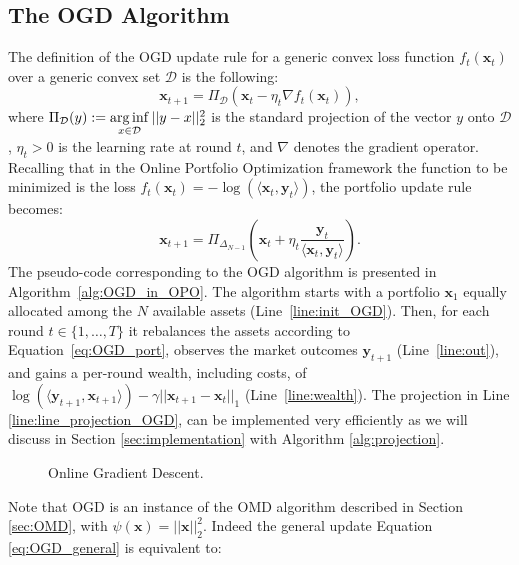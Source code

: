 \subsection{The OGD Algorithm}
\label{sec:OGD}
The definition of the OGD update rule for a generic convex loss function $f_t(\mathbf{x}_t)$ over a generic convex set $\mathcal D$ is the following:
\begin{equation}\label{eq:OGD_general}
  \mathbf{x}_{t+1} = \Pi_{\mathcal D} \left( \mathbf{x}_t - \eta_t \nabla f_t(\mathbf{x}_t) \right),
\end{equation}
where $\Pi_{\mathcal D} (y) := \operatorname*{arg\,inf}\limits_{x \in \mathcal D } || y - x ||_2^2$ is the standard projection of the vector $y$ onto $\mathcal D$, $\eta_t > 0$ is the learning rate at round $t$, and $\nabla$ denotes the gradient operator.
Recalling that in the Online Portfolio Optimization framework the function to be minimized is the loss $f_t(\mathbf{x}_t) = -\log (\langle \mathbf{x}_t, \mathbf{y}_t \rangle )$, the portfolio update rule becomes:
\begin{equation} \label{eq:OGD_port}
   \mathbf{x}_{t+1}= \Pi_{\Delta_{N-1}}\left( \mathbf{x}_t+\eta_t \frac{\mathbf{y}_t}{\langle \mathbf{x}_t, \mathbf{y}_t \rangle}\right).
\end{equation}
The pseudo-code corresponding to the OGD algorithm is presented in Algorithm~\ref{alg:OGD_in_OPO}. 
The algorithm starts with a portfolio $\mathbf{x}_1$ equally allocated among the $N$ available assets (Line~\ref{line:init_OGD}).
Then, for each round $t \in \{ 1, \ldots, T \}$ it rebalances the assets according to Equation~\eqref{eq:OGD_port}, observes the market outcomes $\mathbf{y}_{t+1}$ (Line~\ref{line:out}), and gains a per-round wealth, including costs, of $\log(\langle \mathbf{y}_{t+1},\mathbf{x}_{t+1} \rangle) - \gamma|| \mathbf{x}_{t+1} - \mathbf{x}_{t} ||_1$ (Line~\ref{line:wealth}). The projection in Line \ref{line:line_projection_OGD}, can be implemented very efficiently as we will discuss in Section \ref{sec:implementation} with Algorithm \ref{alg:projection}.

\begin{figure}[ht!]
\centering

\caption{Online Gradient Descent.}
\label{fig:OGD}
\end{figure}

Note that OGD is an instance of the OMD algorithm described in Section \ref{sec:OMD}, with $\psi(\mathbf x)=||\mathbf x||_2^2$. Indeed the general update Equation \eqref{eq:OGD_general} is equivalent to:

